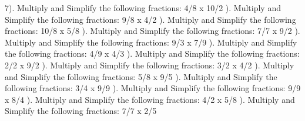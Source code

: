 \documentclass{article}%
\begin{document}
7). Multiply and Simplify the following fractions: 4/8 x 10/2%
\newline%
\newline%
). Multiply and Simplify the following fractions: 9/8 x 4/2%
\newline%
\newline%
). Multiply and Simplify the following fractions: 10/8 x 5/8%
\newline%
\newline%
). Multiply and Simplify the following fractions: 7/7 x 9/2%
\newline%
\newline%
). Multiply and Simplify the following fractions: 9/3 x 7/9%
\newline%
\newline%
). Multiply and Simplify the following fractions: 4/9 x 4/3%
\newline%
\newline%
). Multiply and Simplify the following fractions: 2/2 x 9/2%
\newline%
\newline%
). Multiply and Simplify the following fractions: 3/2 x 4/2%
\newline%
\newline%
). Multiply and Simplify the following fractions: 5/8 x 9/5%
\newline%
\newline%
). Multiply and Simplify the following fractions: 3/4 x 9/9%
\newline%
\newline%
). Multiply and Simplify the following fractions: 9/9 x 8/4%
\newline%
\newline%
). Multiply and Simplify the following fractions: 4/2 x 5/8%
\newline%
\newline%
). Multiply and Simplify the following fractions: 7/7 x 2/5%
\end{document}
